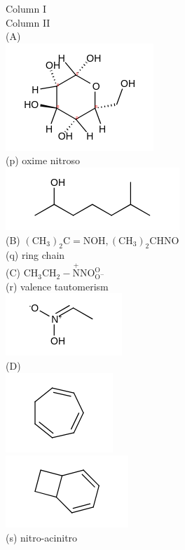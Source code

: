 \documentclass[10pt]{article}
\begin{document}
Column I\\
Column II\\
(A)\\
\includegraphics{smile-471b6b7bc93253f4e466b963dbd51795fb5f6871}\\
(p) oxime nitroso\\
\includegraphics{smile-e69bdb22571b12348ba15cb8b9881fcb92f4c04a}\\
(B) $\left(\mathrm{CH}_{3}\right)_{2} \mathrm{C}=\mathrm{NOH},\left(\mathrm{CH}_{3}\right)_{2} \mathrm{CHNO}$\\
(q) ring chain\\
(C) $\mathrm{CH}_{3} \mathrm{CH}_{2}-\stackrel{+}{\mathrm{N}} \mathrm{NO}_{\mathrm{O}^{-}}^{\mathrm{O}}$\\
(r) valence tautomerism\\
\includegraphics{smile-457c436a9b26b9e9985610e0f917518cd7cc2e1a}\\
(D)\\
\includegraphics{smile-8f1eeebc8bc0f3e5db84aa97ef877b466c13396a}\\
\includegraphics{smile-3f21e922ff8eb7b60d707b8755e1a035dfe3c902}\\
(s) nitro-acinitro
\end{document}
